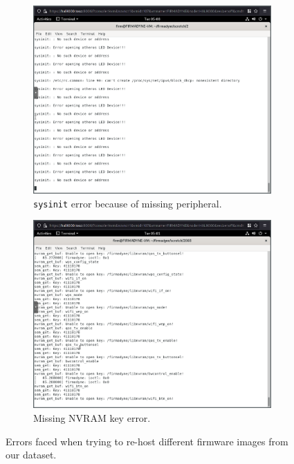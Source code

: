 \begin{figure}[H]
     \hfill
     \begin{subfigure}[b]{0.45\textwidth}
         \centering
         \includegraphics[width=\textwidth]{figs/led-error.png}
         \caption{{\tt sysinit} error because of missing peripheral.}
         \label{fig:}
     \end{subfigure}
     \hfill
     \begin{subfigure}[b]{0.45\textwidth}
         \centering
         \includegraphics[width=\textwidth]{figs/nvram-error.png}
         \caption{Missing NVRAM key error.}
         \label{fig:}
     \end{subfigure}
        \caption{Errors faced when trying to re-host different firmware images from our dataset.}
        \label{fig:firmadyne-errors}
\end{figure}

